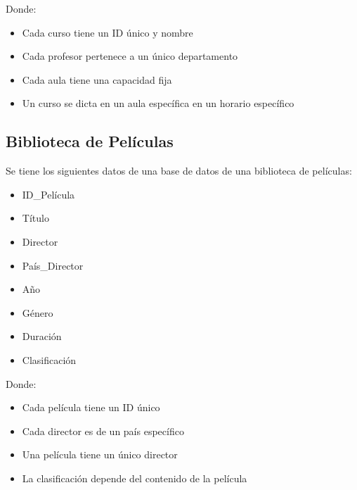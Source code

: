 \documentclass[12pt]{article}
\begin{document}
\vspace{1em}

Donde:
\begin{itemize}
    \item Cada curso tiene un ID único y nombre
    \item Cada profesor pertenece a un único departamento
    \item Cada aula tiene una capacidad fija
    \item Un curso se dicta en un aula específica en un horario específico
\end{itemize}

\subsection{Biblioteca de Películas}
Se tiene los siguientes datos de una base de datos de una biblioteca de películas:

\vspace{0.5em}

\begin{minipage}[t]{0.48\textwidth}
\begin{itemize}
    \item ID\_Película
    \item Título
    \item Director
    \item País\_Director
\end{itemize}
\end{minipage}
\hfill
\begin{minipage}[t]{0.48\textwidth}
\begin{itemize}
    \item Año
    \item Género
    \item Duración
    \item Clasificación
\end{itemize}
\end{minipage}

\vspace{1em}

Donde:
\begin{itemize}
    \item Cada película tiene un ID único
    \item Cada director es de un país específico
    \item Una película tiene un único director
    \item La clasificación depende del contenido de la película
\end{itemize}
\end{document}
